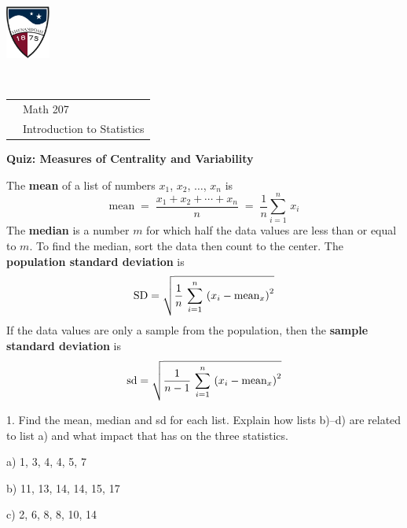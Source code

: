 \documentclass[10pt]{article}
\begin{document}
\pagestyle{empty}
\lstset{language=R, showspaces=false, showstringspaces=false}

\href{http://www.su.edu}{\includegraphics[height=1.75cm]{sulogo.eps}}
\vspace{-1.69cm}

{{\ }\hfill\small
\begin{tabular}{cl}
& Math 207\\
& Introduction to Statistics\\
\end{tabular}
}
\setlength{\baselineskip}{1.05\baselineskip}

\begin{center}
\textbf{\large  Quiz:  Measures of Centrality and Variability}
\end{center}
\newcommand{\Z}{\hphantom{0}}

The \textbf{mean} of a list of numbers $x_1$, $x_2$, $\dots$, $x_n$ is 
\[\mbox{mean}\;=\; \frac{x_1+x_2+\cdots+x_n}{n}\; = \; \frac{1}{n}\sum_{i=1}^n\,x_i\]
The \textbf{median} is a number $m$ for which half the data values are less than or equal to $m$.
To find the median, sort the data then count to the center.
The \textbf{population standard deviation} is \vspace{-3pt}
\[\mbox{SD} = \sqrt{\frac{1}{n}\,\sum_{i=1}^n\,\left(x_i - \mbox{mean}_x\right)^2}\vspace{-3pt}\]
If the data values are only a sample from the population, then the
\textbf{sample standard deviation} is\vspace{-3pt}
\[\mbox{sd} = \sqrt{\frac{1}{n-1}\,\sum_{i=1}^n\,\left(x_i - \mbox{mean}_x\right)^2}\vspace{-3pt}\]

1. Find the mean, median and sd for each list.  
Explain how lists b)--d) are related to list a) and what impact
that has on the three statistics.

\hspace{10pt} a) 1, 3, 4, 4, 5, 7
\vspace{1.3in}

\hspace{10pt} b) 11, 13, 14, 14, 15, 17
\vspace{1.3in}

\hspace{10pt} c) 2, 6, 8, 8, 10, 14
\vspace{1.3in}
\end{document}
